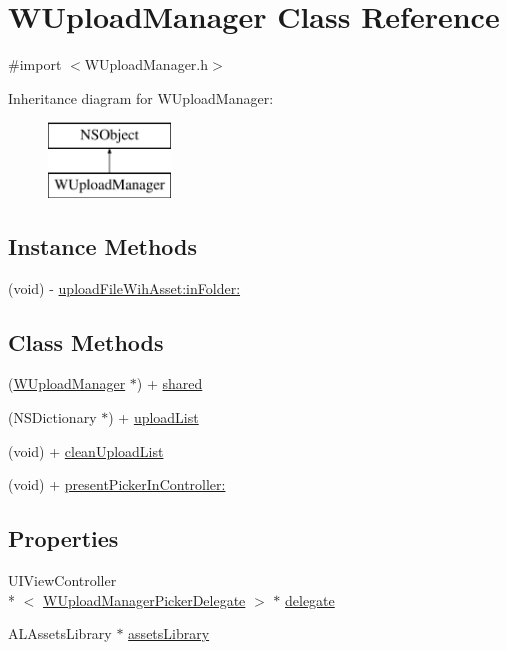\hypertarget{interface_w_upload_manager}{\section{W\-Upload\-Manager Class Reference}
\label{interface_w_upload_manager}
}


{\ttfamily \#import $<$W\-Upload\-Manager.\-h$>$}

Inheritance diagram for W\-Upload\-Manager\-:\begin{figure}[H]
\begin{center}
\leavevmode
\includegraphics[height=2.000000cm]{interface_w_upload_manager}
\end{center}
\end{figure}
\subsection*{Instance Methods}
\begin{DoxyCompactItemize}
\item 
(void) -\/ \hyperlink{interface_w_upload_manager_a013c9e6e29f5d3a1a7fa5f4ef1f1fa19}{upload\-File\-Wih\-Asset\-:in\-Folder\-:}
\end{DoxyCompactItemize}
\subsection*{Class Methods}
\begin{DoxyCompactItemize}
\item 
(\hyperlink{interface_w_upload_manager}{W\-Upload\-Manager} $\ast$) + \hyperlink{interface_w_upload_manager_a8b7bdd22a9eb8542a5a93f813c2e7714}{shared}
\item 
(N\-S\-Dictionary $\ast$) + \hyperlink{interface_w_upload_manager_a05ab331677c8dbb16da6ce55ad812b9e}{upload\-List}
\item 
(void) + \hyperlink{interface_w_upload_manager_a3f6a8a3304886c4a951d669a6f496ebe}{clean\-Upload\-List}
\item 
(void) + \hyperlink{interface_w_upload_manager_ae67580af774da79b22b251d2cc59c6bf}{present\-Picker\-In\-Controller\-:}
\end{DoxyCompactItemize}
\subsection*{Properties}
\begin{DoxyCompactItemize}
\item 
U\-I\-View\-Controller\\*
$<$ \hyperlink{protocol_w_upload_manager_picker_delegate-p}{W\-Upload\-Manager\-Picker\-Delegate} $>$ $\ast$ \hyperlink{interface_w_upload_manager_a870f35ee39fa92fd49939ea31777bada}{delegate}
\item 
A\-L\-Assets\-Library $\ast$ \hyperlink{interface_w_upload_manager_a30094622f4a5143ba72ea9fa61c1d7cf}{assets\-Library}
\end{DoxyCompactItemize}


